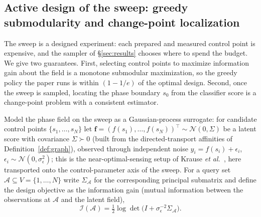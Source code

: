 \documentclass[aps,prresearch,reprint,amsmath,amssymb,nofootinbib,superscriptaddress,floatfix]{revtex4-2}
\theoremstyle{definition}
\theoremstyle{remark}
\theoremstyle{plain}
\begin{document}
\subsection{Active design of the sweep: greedy submodularity and change-point localization}
\label{ssub:design}
The sweep is a designed experiment: each prepared and measured control point is expensive, and the sampler of
\S\ref{sec:results} chooses where to spend the budget. We give two guarantees. First, selecting control
points to maximize information gain about the field is a monotone submodular maximization, so the greedy
policy the paper runs is within $(1-1/e)$ of the optimal design. Second, once the sweep is sampled, locating
the phase boundary $s_0$ from the classifier score is a change-point problem with a consistent estimator.

Model the phase field on the sweep as a Gaussian-process surrogate: for candidate control points
$\{s_1,\dots,s_N\}$ let $\bm f=(f(s_1),\dots,f(s_N))^\top\sim\mathcal N(0,\Sigma)$ be a latent score with
covariance $\Sigma\succ0$ (built from the directed-transport affinities of Definition~\ref{def:graph}),
observed through independent noise $y_i=f(s_i)+\epsilon_i$, $\epsilon_i\sim\mathcal N(0,\sigma_\epsilon^2)$;
this is the near-optimal-sensing setup of Krause \textit{et al.}~\cite{krause2008near}, here transported onto
the control-parameter axis of the sweep.
For a query set $\mathcal A\subseteq V=\{1,\dots,N\}$ write $\Sigma_{\mathcal A}$ for the corresponding
principal submatrix and define the design objective as the information gain (mutual information between the
observations at $\mathcal A$ and the latent field),
\begin{equation}
\mathcal I(\mathcal A)=\tfrac12\log\det\!\big(I+\sigma_\epsilon^{-2}\Sigma_{\mathcal A}\big).
\label{eq:infogain}
\end{equation}
\end{document}
